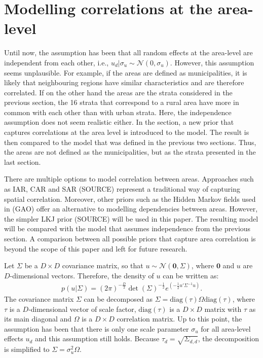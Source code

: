 \section{Modelling correlations at the area-level}

Until now, the assumption has been that all random effects at the area-level are independent from each other, i.e., $u_d|\sigma_u \sim \mathcal N (0, \sigma_u)$.
However, this assumption seems unplausible.
For example, if the areas are defined as municipalities, it is likely that neighbouring regions have similar characteristics and are therefore correlated.
If on the other hand the areas are the strata considered in the previous section, the 16 strata that correspond to a rural area have more in common with each other than with urban strata.
Here, the independence assumption does not seem realistic either.
In the section, a new prior that captures correlations at the area level is introduced to the model.
The result is then compared to the model that was defined in the previous two sections.
Thus, the areas are not defined as the municipalities, but as the strata presented in the last section.

There are multiple options to model correlation between areas.
Approaches such as IAR, CAR and SAR (SOURCE) represent a traditional way of capturing spatial correlation. Moreover, other priors such as the Hidden Markov fields used in (GAO) offer an alternative to modelling dependencies between areas.
However, the simpler LKJ prior (SOURCE) will be used in this paper.
The resulting model will be compared with the model that assumes independence from the previous section.
A comparison between all possible priors that capture area correlation is beyond the scope of this paper and left for future research.

Let $\Sigma$ be a $D \times D$ covariance matrix, so that $u \sim \mathcal{N}(\boldsymbol{0}, \Sigma)$, where $\boldsymbol 0$ and $u$ are $D$-dimensional vectors.
Therefore, the density of $u$ can be written as:
\begin{gather*}
    p(u|\Sigma) = (2\pi)^{-\frac D 2}\det(\Sigma)^{-\frac 1 2} e^{(-\frac 1 2 u'\Sigma^{-1} u)}.
\end{gather*}
The covariance matrix $\Sigma$ can be decomposed as $\Sigma = \text{diag}(\tau)\Omega\text{diag}(\tau)$, where $\tau$ is a $D$-dimensional vector of scale factor, $\text{diag}(\tau)$ is a $D \times D$ matrix with $\tau$ as its main diagonal and $\Omega$ is a $D \times D$ correlation matrix.
Up to this point, the assumption has been that there is only one scale parameter $\sigma_u$ for all area-level effects $u_d$ and this assumption still holds.
Because $\tau_d = \sqrt{\Sigma_{d, d}}$, the decomposition is simplified to $\Sigma = \sigma_u^2 \Omega$.

